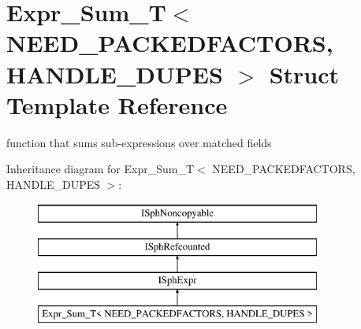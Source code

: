 \hypertarget{structExpr__Sum__T}{\section{Expr\-\_\-\-Sum\-\_\-\-T$<$ N\-E\-E\-D\-\_\-\-P\-A\-C\-K\-E\-D\-F\-A\-C\-T\-O\-R\-S, H\-A\-N\-D\-L\-E\-\_\-\-D\-U\-P\-E\-S $>$ Struct Template Reference}
\label{structExpr__Sum__T}
}


function that sums sub-\/expressions over matched fields  


Inheritance diagram for Expr\-\_\-\-Sum\-\_\-\-T$<$ N\-E\-E\-D\-\_\-\-P\-A\-C\-K\-E\-D\-F\-A\-C\-T\-O\-R\-S, H\-A\-N\-D\-L\-E\-\_\-\-D\-U\-P\-E\-S $>$\-:\begin{figure}[H]
\begin{center}
\leavevmode
\includegraphics[height=4.000000cm]{structExpr__Sum__T}
\end{center}
\end{figure}
